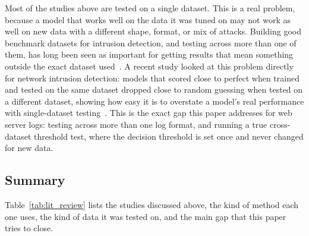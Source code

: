 \documentclass[futureinternet,article,accept,moreauthors]{Definitions/mdpi}
\begin{document}
Most of the studies above are tested on a single dataset. This is a real problem, because a model that works well on the data it was tuned on may not work as well on new data with a different shape, format, or mix of attacks. Building good benchmark datasets for intrusion detection, and testing across more than one of them, has long been seen as important for getting results that mean something outside the exact dataset used~\cite{shiravi2012}. A recent study looked at this problem directly for network intrusion detection: models that scored close to perfect when trained and tested on the same dataset dropped close to random guessing when tested on a different dataset, showing how easy it is to overstate a model's real performance with single-dataset testing~\cite{cantone2024}. This is the exact gap this paper addresses for web server logs: testing across more than one log format, and running a true cross-dataset threshold test, where the decision threshold is set once and never changed for new data.

\subsection{Summary}

Table~\ref{tab:lit_review} lists the studies discussed above, the kind of method each one uses, the kind of data it was tested on, and the main gap that this paper tries to close.
\end{document}
